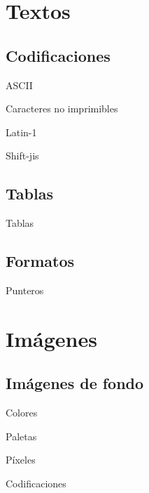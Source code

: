 \section{Textos}
\subsection{Codificaciones}
\begin{frame}{ASCII}
\end{frame}

\begin{frame}{Caracteres no imprimibles}
\end{frame}

\begin{frame}{Latin-1}
\end{frame}

\begin{frame}{Shift-jis}
\end{frame}

\subsection{Tablas}
\begin{frame}{Tablas}
\end{frame}

\subsection{Formatos}
\begin{frame}{Punteros}
\end{frame}

\section{Imágenes}
\subsection{Imágenes de fondo}
\begin{frame}{Colores}
\end{frame}

\begin{frame}{Paletas}
\end{frame}

\begin{frame}{Píxeles}
\end{frame}

\begin{frame}{Codificaciones}
\end{frame}

